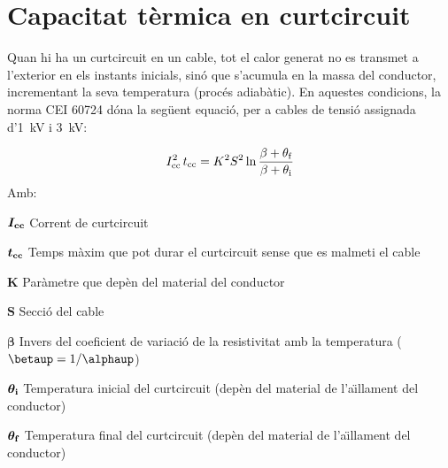 \section{Capacitat t\`{e}rmica en curtcircuit}\label{ces:cables_Icc_termica}

Quan hi ha un curtcircuit en un cable, tot el calor generat no es transmet a l'exterior en els instants inicials, sin\'{o} que s'acumula en la massa del conductor, incrementant la seva temperatura (proc\'{e}s adiab\`{a}tic). En aquestes condicions, la norma \textsf{CEI 60724} d\'{o}na la seg\"{u}ent equaci\'{o}, per a cables de tensi\'{o} assignada d'\SI{1}{kV} i \SI{3}{kV}:

\begin{equation}
   I_\mathrm{cc}^2 \,t_\mathrm{cc} = K^2 S^2 \ln \frac{\beta + \theta_\mathrm{f}}{\beta + \theta_\mathrm{i}}
\end{equation}
Amb:

\begin{list}{}
   {\setlength{\labelwidth}{10mm} \setlength{\leftmargin}{12mm} \setlength{\labelsep}{2mm}}
   \item[\hspace{5mm}$\boldsymbol{I_\mathrm{cc}}$\hfill] Corrent de curtcircuit
   \item[\hspace{5mm}$\boldsymbol{t_\mathrm{cc}}$\hfill] Temps m\`{a}xim que pot durar el curtcircuit sense que es malmeti el cable
   \item[\hspace{5mm}$\boldsymbol{K}$\hfill] Par\`{a}metre que dep\`{e}n del material del conductor
   \item[\hspace{5mm}$\boldsymbol{S}$\hfill] Secci\'{o} del cable
   \item[\hspace{5mm}$\boldsymbol{\beta}$\hfill] Invers del coeficient de variaci\'{o} de la resistivitat amb la temperatura ($\betaup = 1/ \alphaup$)
   \item[\hspace{5mm}$\boldsymbol{\theta_\mathrm{i}}$\hfill] Temperatura inicial del curtcircuit (dep\`{e}n del material de l'a\"{\i}llament del conductor)
   \item[\hspace{5mm}$\boldsymbol{\theta_\mathrm{f}}$\hfill] Temperatura final del curtcircuit (dep\`{e}n del material de l'a\"{\i}llament del conductor)
\end{list}

